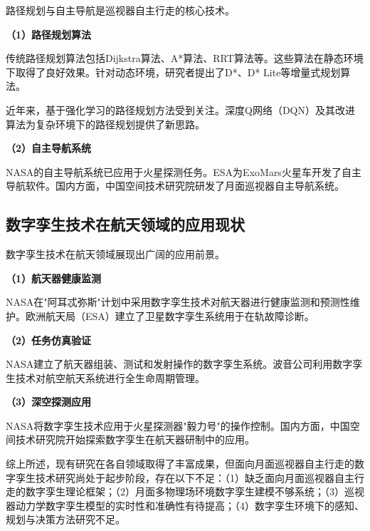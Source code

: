 路径规划与自主导航是巡视器自主行走的核心技术。

\textbf{（1）路径规划算法}

传统路径规划算法包括Dijkstra算法、A*算法\cite{ref31}、RRT算法\cite{ref32}等。这些算法在静态环境下取得了良好效果。针对动态环境，研究者提出了D*、D* Lite等增量式规划算法\cite{ref33}。

近年来，基于强化学习的路径规划方法受到关注。深度Q网络（DQN）及其改进算法\cite{ref34,ref35}为复杂环境下的路径规划提供了新思路。

\textbf{（2）自主导航系统}

NASA的自主导航系统已应用于火星探测任务\cite{ref36}。ESA为ExoMars火星车开发了自主导航软件\cite{ref37}。国内方面，中国空间技术研究院研发了月面巡视器自主导航系统\cite{ref38}。

\subsection{数字孪生技术在航天领域的应用现状}
\label{subsec:dt_aerospace}

数字孪生技术在航天领域展现出广阔的应用前景。

\textbf{（1）航天器健康监测}

NASA在"阿耳忒弥斯"计划中采用数字孪生技术对航天器进行健康监测和预测性维护\cite{ref39}。欧洲航天局（ESA）建立了卫星数字孪生系统用于在轨故障诊断\cite{ref40}。

\textbf{（2）任务仿真验证}

NASA建立了航天器组装、测试和发射操作的数字孪生系统\cite{ref41}。波音公司利用数字孪生技术对航空航天系统进行全生命周期管理\cite{ref42}。

\textbf{（3）深空探测应用}

NASA将数字孪生技术应用于火星探测器"毅力号"的操作控制\cite{ref43}。国内方面，中国空间技术研究院开始探索数字孪生在航天器研制中的应用\cite{ref44}。

综上所述，现有研究在各自领域取得了丰富成果，但面向月面巡视器自主行走的数字孪生技术研究尚处于起步阶段，存在以下不足：（1）缺乏面向月面巡视器自主行走的数字孪生理论框架；（2）月面多物理场环境数字孪生建模不够系统；（3）巡视器动力学数字孪生模型的实时性和准确性有待提高；（4）数字孪生环境下的感知、规划与决策方法研究不足。
